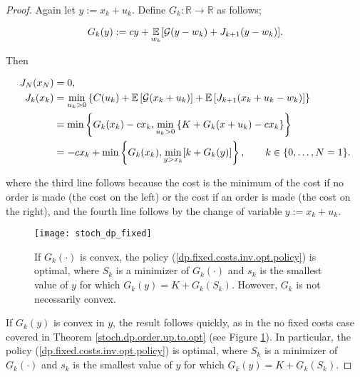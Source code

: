 \begin{proof}

Again let \(y := x_k + u_k\). Define \(G_k: \mathbb{R} \to \mathbb{R}\) as follows;

\begin{equation}\label{dp.def.g_k.fixed.costs}
G_k(y) := cy + \underset{w_k}{\mathbb{E}}[ \mathcal{G}(y - w_k) + J_{k+1}(y - w_k)].
\end{equation}

Then 

\begin{align*}
J_N(x_N) & = 0, \\
J_k(x_k) & = \min_{u_k > 0} \left\{ C(u_k) + \mathbb{E}\left[ \mathcal{G}(x_k + u_k) \right] + \mathbb{E}\left[J_{k+1}(x_k + u_k - w_k) \right] \right\} \\
& = \min \left\{ G_k(x_k) - c x_k, \min_{u_k > 0} \left\{ K + G_k(x + u_k) - c x_k \right\}\right\}
\\ & = - c x_k + \min \left\{G_k(x_k), \min_{y > x_k} [k + G_k(y)] \right\}, \qquad k \in \{0, \ldots, N=1\}.
\end{align*}

where the third line follows because the cost is the minimum of the cost if no order is made (the cost on the left) or the cost if an order is made (the cost on the right), and the fourth line follows by the change of variable \(y := x_k + u_k\).

\begin{figure}[htbp]
\begin{center}
\texttt{[image: stoch\_dp\_fixed]}
\caption{If \(G_k(\cdot)\) is convex, the policy (\ref{dp.fixed.costs.inv.opt.policy}) is optimal, where \(S_k\) is a minimizer of \(G_k(\cdot)\) and \(s_k\) is the smallest value of \(y\) for which \(G_k(y) = K + G_k(S_k)\). However, \(G_k\) is not necessarily convex.}
\label{dp_k_convexity_fig}
\label{stoch_dp_fixed_fig}
\end{center}
\end{figure}




If \(G_k(y)\) is convex in \(y\), the result follows quickly, as in the no fixed costs case covered in Theorem \ref{stoch.dp.order.up.to.opt} (see Figure \ref{stoch_dp_fixed_fig}). In particular, the policy (\ref{dp.fixed.costs.inv.opt.policy}) is optimal, where \(S_k\) is a minimizer of \(G_k(\cdot)\) and \(s_k\) is the smallest value of \(y\) for which \(G_k(y) = K + G_k(S_k)\). 




\end{proof}
